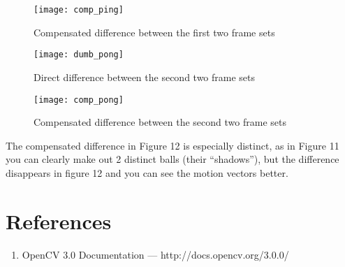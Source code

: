 \documentclass[12pt]{article}
\begin{document}
\begin{figure}[H]
  \centering
  \texttt{[image: comp\_ping]}
  \caption{Compensated difference between the first two frame sets}
\end{figure}

\begin{figure}[H]
  \centering
  \texttt{[image: dumb\_pong]}
  \caption{Direct difference between the second two frame sets}
\end{figure}

\begin{figure}[H]
  \centering
  \texttt{[image: comp\_pong]}
  \caption{Compensated difference between the second two frame sets}
\end{figure}

The compensated difference in Figure 12 is especially distinct, as in Figure 11
you can clearly make out 2 distinct balls (their ``shadows''), but the
difference disappears in figure 12 and you can see the motion vectors better.

\section{References}

\begin{enumerate}
\item OpenCV 3.0 Documentation --- http://docs.opencv.org/3.0.0/
\end{enumerate}
\end{document}

